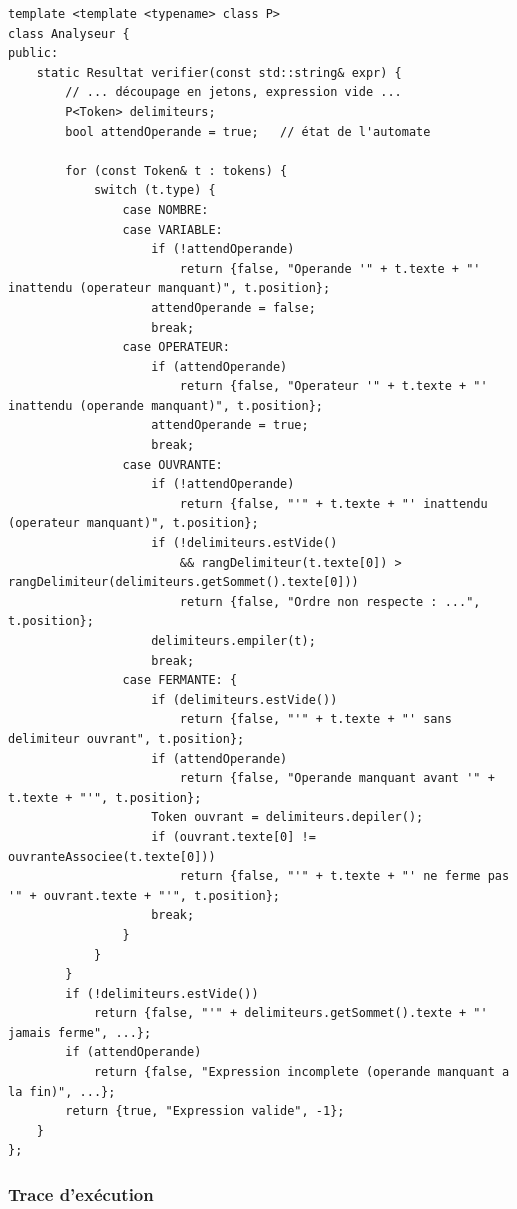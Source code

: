 \documentclass[11pt,a4paper]{article}
\newcommand{\code}[1]{\texttt{#1}}
\begin{document}
\begin{lstlisting}[caption={Cœur de la méthode \code{verifier}}]
template <template <typename> class P>
class Analyseur {
public:
    static Resultat verifier(const std::string& expr) {
        // ... découpage en jetons, expression vide ...
        P<Token> delimiteurs;
        bool attendOperande = true;   // état de l'automate

        for (const Token& t : tokens) {
            switch (t.type) {
                case NOMBRE:
                case VARIABLE:
                    if (!attendOperande)
                        return {false, "Operande '" + t.texte + "' inattendu (operateur manquant)", t.position};
                    attendOperande = false;
                    break;
                case OPERATEUR:
                    if (attendOperande)
                        return {false, "Operateur '" + t.texte + "' inattendu (operande manquant)", t.position};
                    attendOperande = true;
                    break;
                case OUVRANTE:
                    if (!attendOperande)
                        return {false, "'" + t.texte + "' inattendu (operateur manquant)", t.position};
                    if (!delimiteurs.estVide()
                        && rangDelimiteur(t.texte[0]) > rangDelimiteur(delimiteurs.getSommet().texte[0]))
                        return {false, "Ordre non respecte : ...", t.position};
                    delimiteurs.empiler(t);
                    break;
                case FERMANTE: {
                    if (delimiteurs.estVide())
                        return {false, "'" + t.texte + "' sans delimiteur ouvrant", t.position};
                    if (attendOperande)
                        return {false, "Operande manquant avant '" + t.texte + "'", t.position};
                    Token ouvrant = delimiteurs.depiler();
                    if (ouvrant.texte[0] != ouvranteAssociee(t.texte[0]))
                        return {false, "'" + t.texte + "' ne ferme pas '" + ouvrant.texte + "'", t.position};
                    break;
                }
            }
        }
        if (!delimiteurs.estVide())
            return {false, "'" + delimiteurs.getSommet().texte + "' jamais ferme", ...};
        if (attendOperande)
            return {false, "Expression incomplete (operande manquant a la fin)", ...};
        return {true, "Expression valide", -1};
    }
};
\end{lstlisting}

\subsubsection{Trace d'exécution}
\end{document}
